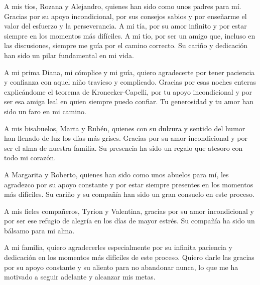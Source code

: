 \begin{acknowledgements}
    \vspace{1em}

    \noindent
    
    A mis tíos, Rozana y Alejandro, quienes han sido como unos padres para mí. Gracias por su apoyo incondicional, por sus consejos sabios y por enseñarme el valor del esfuerzo y la perseverancia. A mi tía, por su amor infinito y por estar siempre en los momentos más difíciles. A mi tío, por ser un amigo que, incluso en las discusiones, siempre me guía por el camino correcto. Su cariño y dedicación han sido un pilar fundamental en mi vida.
    
    \vspace{1em}

    \noindent
    A mi prima Diana, mi cómplice y mi guía, quiero agradecerte por tener paciencia y confianza con aquel niño travieso y complicado. Gracias por esas noches enteras explicándome el teorema de Kronecker-Capelli, por tu apoyo incondicional y por ser esa amiga leal en quien siempre puedo confiar. Tu generosidad y tu amor han sido un faro en mi camino.

    \vspace{1em}
    
    \noindent

    A mis bisabuelos, Marta y Rubén, quienes con su dulzura y sentido del humor han llenado de luz los días más grises. Gracias por su amor incondicional y por ser el alma de nuestra familia. Su presencia ha sido un regalo que atesoro con todo mi corazón.

    \vspace{1em}

    \noindent
    A Margarita y Roberto, quienes han sido como unos abuelos para mí, les agradezco por su apoyo constante y por estar siempre presentes en los momentos más difíciles. Su cariño y su compañía han sido un gran consuelo en este proceso.

    \vspace{1em}

    \noindent

    A mis fieles compañeros, Tyrion y Valentina, gracias por su amor incondicional y por ser ese refugio de alegría en los días de mayor estrés. Su compañía ha sido un bálsamo para mi alma.

    \vspace{1em}

    \noindent
    A mi familia, quiero agradecerles especialmente por su infinita paciencia y dedicación en los momentos más difíciles de este proceso. Quiero darle las gracias por su apoyo constante y su aliento para no abandonar nunca, lo que me ha motivado a seguir adelante y alcanzar mis metas.
    \vspace{1em}


\end{acknowledgements}

